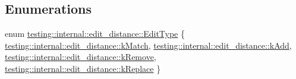 \subsection*{Enumerations}
\begin{DoxyCompactItemize}
\item 
enum \hyperlink{namespacetesting_1_1internal_1_1edit__distance_ad46aa6da12aec1a3f166310478b53a08}{testing\+::internal\+::edit\+\_\+distance\+::\+Edit\+Type} \{ \hyperlink{namespacetesting_1_1internal_1_1edit__distance_ad46aa6da12aec1a3f166310478b53a08a7bdb9c74613a94f21b7489e0b5640a63}{testing\+::internal\+::edit\+\_\+distance\+::k\+Match}, 
\hyperlink{namespacetesting_1_1internal_1_1edit__distance_ad46aa6da12aec1a3f166310478b53a08a63400b073f5b311a87d568b5ae27ffe8}{testing\+::internal\+::edit\+\_\+distance\+::k\+Add}, 
\hyperlink{namespacetesting_1_1internal_1_1edit__distance_ad46aa6da12aec1a3f166310478b53a08a814768ef6cd0264a0a10b1e701a63e78}{testing\+::internal\+::edit\+\_\+distance\+::k\+Remove}, 
\hyperlink{namespacetesting_1_1internal_1_1edit__distance_ad46aa6da12aec1a3f166310478b53a08afdbf30ecf9f32f60c646a34a358615f2}{testing\+::internal\+::edit\+\_\+distance\+::k\+Replace}
 \}
\end{DoxyCompactItemize}

